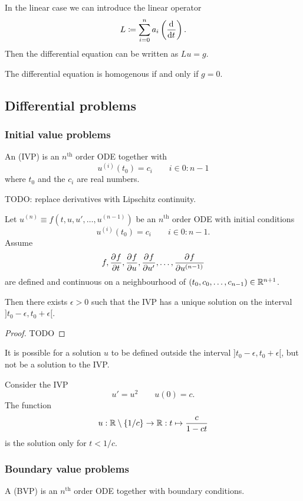 In the linear case we can introduce the linear operator
\[ L \coloneqq \sum_{i=0}^n a_{i} \left(\mathinner{ \dfrac{\operatorname{d \!}{^{}}}{\operatorname{d \!}{{t}^{}}} }\right). \]
Then the differential equation can be written as $Lu = g$.

The differential equation is homogenous if and only if $g = 0$.

\subsection{Differential problems}
\subsubsection{Initial value problems}
\begin{definition}
An  (IVP) is an $n^{\text{th}}$ order ODE together with 
\[ u^{(i)}(t_0) = c_i \qquad i \in 0:n-1 \]
where $t_0$ and the $c_i$ are real numbers.
\end{definition}

TODO: replace derivatives with Lipschitz continuity.
\begin{theorem}
Let $u^{(n)} \equiv f(t,u,u',\ldots, u^{(n-1)})$ be an $n^{\text{th}}$ order ODE with initial conditions
\[ u^{(i)}(t_0) = c_i \qquad i \in 0:n-1. \]
Assume
\[ f,  \frac{\partial{^{}}f}{\partial{{t}^{}}} ,  \frac{\partial{^{}}f}{\partial{{u}^{}}} ,  \frac{\partial{^{}}f}{\partial{{u'}^{}}} , \ldots,  \frac{\partial{^{}}f}{\partial{{u^{(n-1)}}^{}}}  \]
are defined and continuous on a neighbourhood of $(t_0, c_0, \ldots, c_{n-1})\in \mathbb{R}^{n+1}$.

Then there exists $\epsilon > 0$ such that the IVP has a unique solution on the interval $]t_0-\epsilon, t_0+\epsilon[$.
\end{theorem}
\begin{proof}
TODO
\end{proof}

It is possible for a solution $u$ to be defined outside the interval $]t_0-\epsilon, t_0+\epsilon[$, but not be a solution to the IVP.
\begin{example}
Consider the IVP
\[ u' = u^2 \qquad u(0) = c. \]
The function
\[ u: \mathbb{R}\setminus\{1/c\} \to \mathbb{R}: t\mapsto \frac{c}{1-ct} \]
is the solution only for $t < 1/c$.
\end{example}

\subsubsection{Boundary value problems}
\begin{definition}
A  (BVP) is an $n^{\text{th}}$ order ODE together with boundary conditions.
\end{definition}

